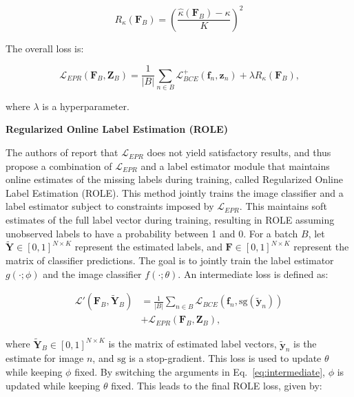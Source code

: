 \documentclass[lettersize,journal]{IEEEtran}
\renewcommand{\paragraph}[1]{%
  \vspace{1.5ex}\textbf{#1}\quad
}
\begin{document}
\begin{equation}
    R_\kappa(\mathbf{F}_B) = \left(\frac{\hat{\kappa}(\mathbf{F}_B)-\kappa}{K}\right)^2
\end{equation}

\noindent The overall loss is:

\begin{equation}
    \label{eq:epr}
    \mathcal{L}_{EPR}(\mathbf{F}_B,\mathbf{Z}_B) = \frac{1}{|B|}\sum_{n\in B}\mathcal{L}_{BCE}^+(\mathbf{f}_n,\mathbf{z}_n)+\lambda R_\kappa(\mathbf{F}_B)\text{,}
\end{equation}

\noindent where $\lambda$ is a hyperparameter.


\paragraph{Regularized Online Label Estimation (ROLE)}
The authors of \cite{mlsp} report that $\mathcal{L}_{EPR}$ does not yield satisfactory results, and thus propose a combination of $\mathcal{L}_{EPR}$ and a label estimator module that maintains online estimates of the missing labels during training, called Regularized Online Label Estimation (ROLE). This method jointly trains the image classifier and a label estimator subject to constraints imposed by $\mathcal{L}_{EPR}$. This maintains soft estimates of the full label vector during training, resulting in ROLE assuming unobserved labels to have a probability between 1 and 0. For a batch $B$, let $\mathbf{\tilde{Y}}\in[0,1]^{N\times K}$ represent the estimated labels, and $\mathbf{F}\in[0,1]^{N\times K}$ represent the matrix of classifier predictions. The goal is to jointly train the label estimator $g(\cdot;\phi)$ and the image classifier $f(\cdot;\theta)$. An intermediate loss is defined as:

\begin{equation}
    \label{eq:intermediate}
    \begin{aligned}
        \mathcal{L}'(\mathbf{F}_B,\tilde{\mathbf{Y}}_B) &= \frac{1}{|B|}\sum_{n\in B} \mathcal{L}_{BCE}(\mathbf{f}_n,\text{sg}(\tilde{\mathbf{y}}_n)) \\
        &+ \mathcal{L}_{EPR}(\mathbf{F}_B,\mathbf{Z}_B)\text{,}
    \end{aligned}
\end{equation}

\noindent where $\tilde{\mathbf{Y}}_B\in [0,1]^{N\times K}$ is the matrix of estimated label vectors, $\tilde{\mathbf{y}}_n$ is the estimate for image $n$, and $\text{sg}$ is a stop-gradient. This loss is used to update $\theta$ while keeping $\phi$ fixed. By switching the arguments in Eq.~\ref{eq:intermediate}, $\phi$ is updated while keeping $\theta$ fixed. This leads to the final ROLE loss, given by:
\end{document}
